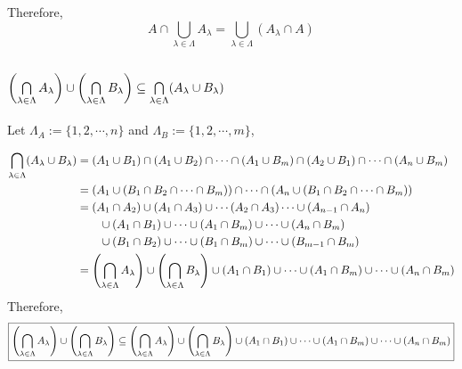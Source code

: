 \documentclass[]{article}
\begin{document}
Therefore,
\begin{displaymath}
	\boxed{A \cap \bigcup\limits_{\lambda \in \Lambda}  A_\lambda
	= \bigcup\limits_{\lambda \in \Lambda} (A_\lambda \cap A)}
\end{displaymath}


\subsection{
	$\qty(\bigcap\limits_{\lambda\in\Lambda} A_{\lambda}) \cup
	 \qty(\bigcap\limits_{\lambda\in\Lambda} B_{\lambda})
	 \subseteq \bigcap\limits_{\lambda\in\Lambda} (A_\lambda \cup B_\lambda)$
}

Let $\Lambda_A := \{1, 2, \cdots, n\}$ and $\Lambda_B := \{1, 2, \cdots, m\}$,

\begin{align*}
	\bigcap\limits_{\lambda\in\Lambda} (A_\lambda \cup B_\lambda)
	&= (A_1 \cup B_1) \cap (A_1 \cup B_2) \cap 
	\cdots \cap (A_1 \cup B_m) \cap (A_2 \cup B_1) \cap
	\cdots \cap (A_n \cup B_m)\\
	&= \qty(A_1 \cup \qty(B_1 \cap B_2 \cap \cdots \cap B_m)) \cap \cdots
	\cap \qty(A_n \cup \qty(B_1 \cap B_2 \cap \cdots \cap B_m))\\
	&= (A_1 \cap A_2) \cup (A_1 \cap A_3) \cup \cdots (A_2 \cap A_3) \cdots 
	\cup (A_{n-1} \cap A_n)\\
	&\qquad \cup (A_1 \cap B_1) \cup \cdots \cup (A_1 \cap B_m) \cup \cdots \cup (A_n \cap B_m)\\
	&\qquad \cup (B_1 \cap B_2) \cup \cdots	\cup (B_1 \cap B_m) \cup \cdots \cup (B_{m-1} \cap B_{m})\\
	&= \qty(\bigcap\limits_{\lambda\in\Lambda} A_{\lambda}) \cup 
	\qty(\bigcap\limits_{\lambda\in\Lambda} B_{\lambda})
	\cup (A_1 \cap B_1) \cup \cdots \cup (A_1 \cap B_m) \cup \cdots \cup (A_n \cap B_m)\\
\end{align*}
Therefore,
\begin{align*}
	\boxed{
	\qty(\bigcap\limits_{\lambda\in\Lambda} A_{\lambda}) \cup
	\qty(\bigcap\limits_{\lambda\in\Lambda} B_{\lambda})
	\subseteq \qty(\bigcap\limits_{\lambda\in\Lambda} A_{\lambda}) \cup 
	\qty(\bigcap\limits_{\lambda\in\Lambda} B_{\lambda})
	\cup (A_1 \cap B_1) \cup \cdots \cup (A_1 \cap B_m) \cup \cdots \cup (A_n \cap B_m)
	}
\end{align*}
\end{document}
